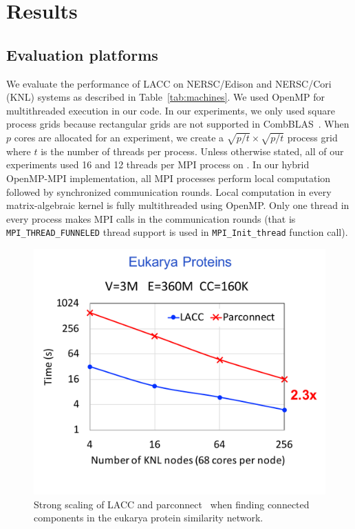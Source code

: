 \section{Results}
\label{sec:results}

\subsection{Evaluation platforms} 
We evaluate the performance of LACC on NERSC/Edison and NERSC/Cori (KNL) systems  as described in Table~\ref{tab:machines}.
We used OpenMP for multithreaded execution in our code. 
In our experiments, we only used square process grids because rectangular grids are not supported in CombBLAS~\cite{bulucc2011combinatorial}. 
When $p$ cores are allocated for an experiment, we create a $\sqrt{p/t} \times \sqrt{p/t} $ process grid where $t$ is the number of threads per process.
Unless otherwise stated, all of our experiments used 16 and 12 threads per MPI process on .
In our hybrid OpenMP-MPI implementation, all MPI processes perform local computation followed by synchronized communication rounds. 
Local computation in every matrix-algebraic kernel is fully multithreaded using OpenMP.
Only one thread in every process makes MPI calls in the communication rounds (that is \texttt{MPI\_THREAD\_FUNNELED} thread support is used in \texttt{MPI\_Init\_thread} function call).

\begin{figure}[!t]
   \centering
   \includegraphics[scale=.5]{figures/eukarya} %
   \caption{Strong scaling of LACC and parconnect~\cite{jain2017adaptive} when finding connected components in  the eukarya protein similarity network. }
   \label{fig:eukarya}
\end{figure}

